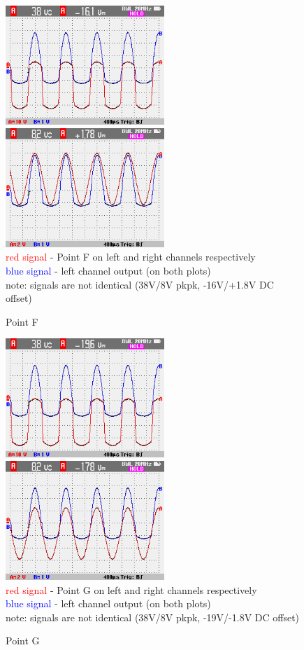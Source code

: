 \documentclass[a4paper,twoside]{report}
\begin{document}
\begin{figure}[hptb!]
    \centering
    \includegraphics[width=6cm]{img_report/left_point_F.png}
    \includegraphics[width=6cm]{img_report/right_point_F.png} \\ 
    \textcolor{Red}{red signal} - Point F on left and right channels respectively \\
    \textcolor{Blue}{blue signal} - left channel output (on both plots) \\
    note: signals are not identical (38V/8V pkpk, -16V/+1.8V DC offset)
 \caption{Point F}
 \label{fig:point-F}
\end{figure}

\begin{figure}[hptb!]
    \centering
    \includegraphics[width=6cm]{img_report/left_point_G.png}
    \includegraphics[width=6cm]{img_report/right_point_G.png} \\ 
    \textcolor{Red}{red signal} - Point G on left and right channels respectively \\
    \textcolor{Blue}{blue signal} - left channel output (on both plots) \\
    note: signals are not identical (38V/8V pkpk, -19V/-1.8V DC offset)
 \caption{Point G}
 \label{fig:point-G}
\end{figure}
\end{document}
